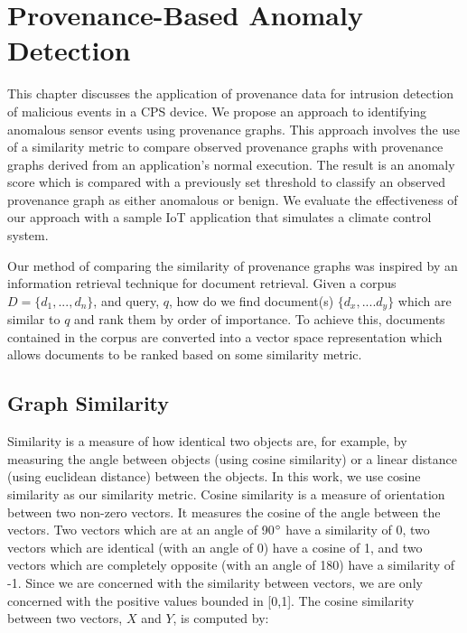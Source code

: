 
\chapter{Provenance-Based Anomaly Detection} \label{sec:prov_anomaly}
This chapter discusses the application of provenance data for intrusion detection of malicious events in a CPS device. We propose an approach to identifying anomalous sensor events using provenance graphs. This approach involves the use of a similarity metric to compare observed provenance graphs with provenance graphs derived from an application's normal execution. The result is an anomaly score which is  compared with a previously set threshold to classify an observed provenance graph as either anomalous or benign. We evaluate the effectiveness of our approach with a sample IoT application that simulates a climate control system.
 
 \par Our method of comparing the similarity of provenance graphs was inspired by an information retrieval technique for document retrieval. Given a corpus $D = \{ d_1,..., d_n\}$, and query, $q$, how do we find document(s) $\{d_x,....d_y\}$ which are similar to $q$ and rank them by order of importance. To achieve this, documents contained in the corpus are converted into a vector space representation which allows documents to be ranked based on some similarity metric.


\section{Graph Similarity} \label{similarity}
Similarity is a measure of how identical two objects are, for example, by measuring the angle between objects (using cosine similarity) or a linear distance (using euclidean distance) between the objects. In this work, we use cosine similarity as our similarity metric. Cosine similarity is a measure of orientation between two non-zero vectors. It measures the cosine of the angle between the vectors. Two vectors which are at an angle of 90$\degree$ have a similarity of 0, two vectors which are identical (with an angle of 0\degree) have a cosine of 1, and two vectors which are completely opposite (with an angle of 180\degree) have a similarity of -1. Since we are concerned with the similarity between vectors, we are only concerned with the positive values bounded in [0,1]. The cosine similarity between two vectors, $X$ and $Y$, is computed by:

